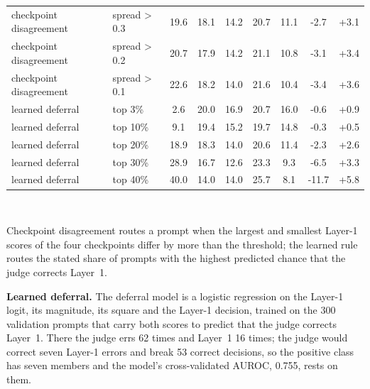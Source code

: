 \begin{table}[!htbp]
\begin{tabular}{@{}llccccccc@{}}
checkpoint disagreement & spread > 0.3 & 19.6 & 18.1 & 14.2 & 20.7 & 11.1 & -2.7 & +3.1 \\
checkpoint disagreement & spread > 0.2 & 20.7 & 17.9 & 14.2 & 21.1 & 10.8 & -3.1 & +3.4 \\
checkpoint disagreement & spread > 0.1 & 22.6 & 18.2 & 14.0 & 21.6 & 10.4 & -3.4 & +3.6 \\
learned deferral & top 3\% & 2.6 & 20.0 & 16.9 & 20.7 & 16.0 & -0.6 & +0.9 \\
learned deferral & top 10\% & 9.1 & 19.4 & 15.2 & 19.7 & 14.8 & -0.3 & +0.5 \\
learned deferral & top 20\% & 18.9 & 18.3 & 14.0 & 20.6 & 11.4 & -2.3 & +2.6 \\
learned deferral & top 30\% & 28.9 & 16.7 & 12.6 & 23.3 & 9.3 & -6.5 & +3.3 \\
learned deferral & top 40\% & 40.0 & 14.0 & 14.0 & 25.7 & 8.1 & -11.7 & +5.8 \\
\bottomrule
\end{tabular}
\\[2pt]
\parbox{\linewidth}{\scriptsize Checkpoint disagreement routes a prompt when the largest and smallest Layer-1 scores of the four checkpoints differ by more than the threshold; the learned rule routes the stated share of prompts with the highest predicted chance that the judge corrects Layer~1.}
\end{table}

\textbf{Learned deferral.} The deferral model is a logistic regression on the Layer-1 logit, its magnitude, its square and the Layer-1 decision, trained on the 300 validation prompts that carry both scores to predict that the judge corrects Layer~1. There the judge errs 62 times and Layer~1 16 times; the judge would correct seven Layer-1 errors and break 53 correct decisions, so the positive class has seven members and the model's cross-validated AUROC, 0.755, rests on them.

